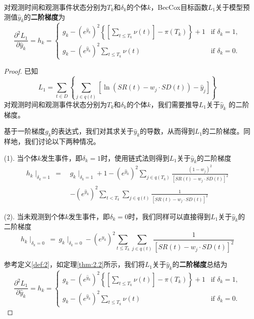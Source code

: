 \begin{theorem}\label{thm:2.2}
对观测时间和观测事件状态分别为$T_k$和$\delta_k$的个体$k$，BecCox目标函数$L_1$关于模型预测值$\hat{y}_k$的\textbf{二阶梯度}为$$
\frac{\partial^2 L_1}{\partial \hat{y}_k} = h_k = 
\begin{cases}
g_k - (e^{\hat{y}_k})^2 \left\{ \left[\sum_{t\le T_k} \nu(t)\right] - \pi(T_k) \right\} + 1 & \text{if } \delta_k = 1,\\
g_k - (e^{\hat{y}_k})^2 \sum_{t\le T_k} \nu(t) & \text{if } \delta_k = 0.
\end{cases}
$$
\end{theorem}

\begin{proof}
已知$$L_1 = \sum_{t\in D} \left\{ \sum_{j\in q(t)} [\ln(SR(t)-w_j\cdot SD(t))-\hat{y}_j] \right\}$$ 对观测时间和观测事件状态分别为$T_k$和$\delta_k$的个体$k$，我们需要推导$L_1$关于$\hat{y}_k$ 的二阶梯度。

基于一阶梯度$g_k$的表达式，我们对其求关于$\hat{y}_k$的导数，从而得到$L_1$的二阶梯度。同样地，我们讨论以下两种情况。

(1). 当个体$k$发生事件，即$\delta_k=1$时，使用链式法则得到$L_1$关于$\hat{y}_k$的二阶梯度\[
\begin{split}
h_k\mid_{\delta_k=1}\ =\ & g_k\mid_{\delta_k=1} + 1 - (e^{\hat{y}_k})^2 \sum_{j\in q(T_k)} \frac{(1-w_j)^2}{[SR(t) - w_j\cdot SD(t)]^2} \\
   & -(e^{\hat{y}_k})^2 \sum_{t< T_k} \sum_{j\in q(t)} \frac{1}{[SR(t) - w_j\cdot SD(t)]^2}
\end{split}
\]

(2). 当未观测到个体$k$发生事件，即$\delta_k=0$时，我们同样可以直接得到$L_1$关于$\hat{y}_k$的二阶梯度$$
h_k\mid_{\delta_k=0}\ =\ g_k\mid_{\delta_k=0} - (e^{\hat{y}_k})^2 \sum_{t\le T_k} \sum_{j\in q(t)} \frac{1}{[SR(t) - w_j\cdot SD(t)]^2}
$$

参考定义\ref{def:2}，如定理\ref{thm:2.2}所示，我们将$L_1$关于$\hat{y}_k$的\textbf{二阶梯度}总结为$$
\frac{\partial^2 L_1}{\partial \hat{y}_k} = h_k = 
\begin{cases}
g_k - (e^{\hat{y}_k})^2 \left\{ \left[\sum_{t\le T_k} \nu(t)\right] - \pi(T_k) \right\} + 1 & \text{if } \delta_k = 1,\\
g_k - (e^{\hat{y}_k})^2 \sum_{t\le T_k} \nu(t) & \text{if } \delta_k = 0.
\end{cases}
$$
\end{proof}

